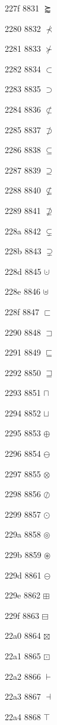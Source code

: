 \documentclass[11pt]{article}
\begin{document}
227f 8831 \ensuremath{\succapprox}

2280 8832 \ensuremath{\nprec}

2281 8833 \ensuremath{\nsucc}

2282 8834 \ensuremath{\subset}

2283 8835 \ensuremath{\supset}

2284 8836 \ensuremath{\nsubset}

2285 8837 \ensuremath{\nsupset}

2286 8838 \ensuremath{\subseteq}

2287 8839 \ensuremath{\supseteq}

2288 8840 \ensuremath{\nsubseteq}

2289 8841 \ensuremath{\nsupseteq}

228a 8842 \ensuremath{\subsetneq}

228b 8843 \ensuremath{\supsetneq}

228d 8845 \ensuremath{\cupdot}

228e 8846 \ensuremath{\uplus}

228f 8847 \ensuremath{\sqsubset}

2290 8848 \ensuremath{\sqsupset}

2291 8849 \ensuremath{\sqsubseteq}

2292 8850 \ensuremath{\sqsupseteq}

2293 8851 \ensuremath{\sqcap}

2294 8852 \ensuremath{\sqcup}

2295 8853 \ensuremath{\oplus}

2296 8854 \ensuremath{\ominus}

2297 8855 \ensuremath{\otimes}

2298 8856 \ensuremath{\oslash}

2299 8857 \ensuremath{\odot}

229a 8858 \ensuremath{\circledcirc}

229b 8859 \ensuremath{\circledast}

229d 8861 \ensuremath{\circleddash}

229e 8862 \ensuremath{\boxplus}

229f 8863 \ensuremath{\boxminus}

22a0 8864 \ensuremath{\boxtimes}

22a1 8865 \ensuremath{\boxdot}

22a2 8866 \ensuremath{\vdash}

22a3 8867 \ensuremath{\dashv}

22a4 8868 \ensuremath{\top}
\end{document}
